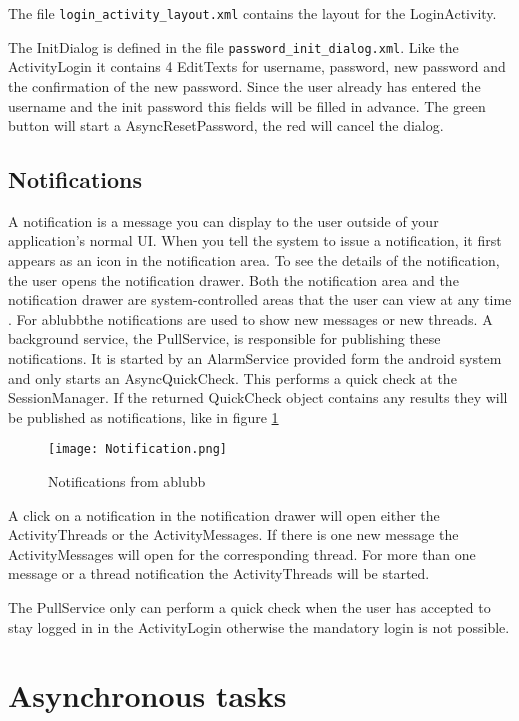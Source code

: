 \documentclass[12pt,a4paper,oneside]{report}
\newcommand{\appname}{ablubb}
\newcommand{\code}[1]{\lstinline{#1}}
\begin{document}
The file \code{login_activity_layout.xml} contains the layout for the LoginActivity. 

The InitDialog is defined in the file \code{password_init_dialog.xml}. Like the ActivityLogin it contains 4 EditTexts for username, password, new password and the confirmation of the new password. Since the user already has entered the username and the init password this fields will be filled in advance. The green button will start a AsyncResetPassword, the red will cancel the dialog. 

\subsection{Notifications}
A notification is a message you can display to the user outside of your application's normal UI. When you tell the system to issue a notification, it first appears as an icon in the notification area. To see the details of the notification, the user opens the notification drawer. Both the notification area and the notification drawer are system-controlled areas that the user can view at any time \citep{aDefNotifications}.
For \appname  the notifications are used to show new messages or new threads. A background service, the PullService, is responsible for publishing these notifications. It is started by an AlarmService provided form the android system and only starts an AsyncQuickCheck. This performs a quick check at the SessionManager. If the returned QuickCheck object contains any results they will be published as notifications, like in figure \ref{fig:notifications}

\begin{figure}[!ht]
    \texttt{[image: Notification.png]}
	\caption{Notifications from \appname} 
	\label{fig:notifications}
\end{figure}

A click on a notification in the notification drawer will open either the ActivityThreads or the ActivityMessages. If there is one new message the ActivityMessages will open for the corresponding thread. For more than one message or a thread notification the ActivityThreads will be started.

The PullService only can perform a quick check when the user has accepted to stay logged in in the ActivityLogin otherwise the mandatory login is not possible.

\section{Asynchronous tasks}
\end{document}
